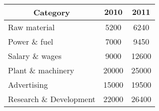  \begin{tabular}{|l|c|c|}
\hline \multicolumn{1}{|c|}{ Category } & $\mathbf{2 0 1 0}$ & $\mathbf{2 0 1 1}$ \\
\hline Raw material & 5200 & 6240 \\
\hline Power \& fuel & 7000 & 9450 \\
\hline Salary \& wages & 9000 & 12600 \\
\hline Plant \& machinery & 20000 & 25000 \\
\hline Advertising & 15000 & 19500 \\
\hline Research \& Development & 22000 & 26400 \\
\hline
\end{tabular}

